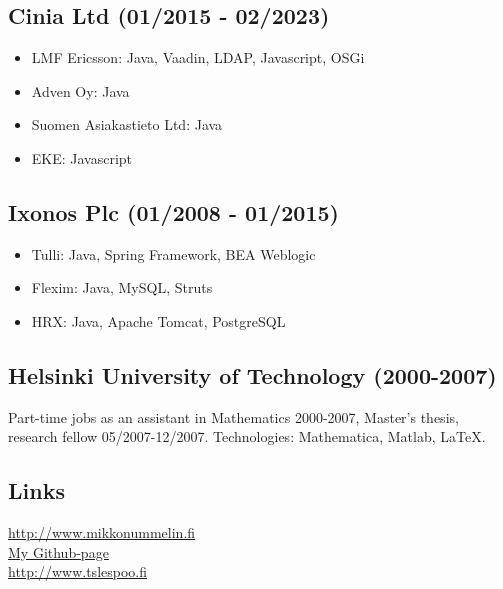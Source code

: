 \documentclass[a4paper,12pt]{article}
\begin{document}
\subsection*{Cinia Ltd (01/2015 - 02/2023)}
\begin{itemize}
\item{LMF Ericsson: Java, Vaadin, LDAP, Javascript, OSGi}
\item{Adven Oy: Java}
\item{Suomen Asiakastieto Ltd: Java}
\item{EKE: Javascript}
\end{itemize}
\subsection*{Ixonos Plc (01/2008 - 01/2015)}
\begin{itemize}
\item{Tulli: Java, Spring Framework, BEA Weblogic}
\item{Flexim: Java, MySQL, Struts}
\item{HRX: Java, Apache Tomcat, PostgreSQL}
\end{itemize}
\subsection*{Helsinki University of Technology (2000-2007)}
Part-time jobs as an assistant in Mathematics 2000-2007, Master's thesis, research fellow 05/2007-12/2007. Technologies: Mathematica, Matlab, LaTeX.
\subsection*{Links}
\href{http://www.mikkonummelin.fi}{http://www.mikkonummelin.fi} \\
\href{http://github.com/mnummeli}{My Github-page} \\
\href{http://www.tslespoo.fi}{http://www.tslespoo.fi}
\end{document}
